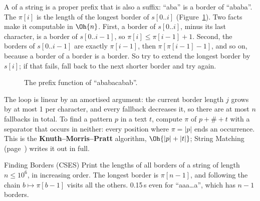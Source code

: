 A  of a string is a proper prefix that is also a suffix: ``aba'' is a border of ``ababa''. The  $\pi[i]$
is the length of the longest border of $s[0..i]$ (Figure~\ref{fig:prefixfunc}). Two facts make it computable in $\Oh{n}$. First, a border
of $s[0..i]$, minus its last character, is a border of $s[0..i-1]$, so $\pi[i] \le \pi[i-1] + 1$. Second, the borders of $s[0..i-1]$ are
exactly $\pi[i-1]$, then $\pi[\pi[i-1] - 1]$, and so on, because a border of a border is a border. So try to extend the longest border
by $s[i]$; if that fails, fall back to the next shorter border and try again.

\begin{figure}[htbp]
\centering
{}
\caption{The prefix function of ``ababacabab''.}
\label{fig:prefixfunc}
\end{figure}

The loop is linear by an amortised argument: the current border length $j$ grows by at most 1 per character, and every fallback
decreases it, so there are at most $n$ fallbacks in total. To find a pattern $p$ in a text $t$, compute $\pi$ of $p + \# + t$ with a
separator that occurs in neither: every position where $\pi = |p|$ ends an occurrence. This is the \textbf{Knuth--Morris--Pratt}
algorithm, $\Oh{|p| + |t|}$; String Matching (page~\pageref{wp:kmp}) writes it out in full.


\begin{problem}{Finding Borders (CSES)}
Print the lengths of all borders of a string of length $n \le 10^6$, in increasing order.
\solution The longest border is $\pi[n-1]$, and following the chain $b \mapsto \pi[b - 1]$ visits all the others. 0.15\,s even for
``aaa\dots a'', which has $n - 1$ borders.
\end{problem}

